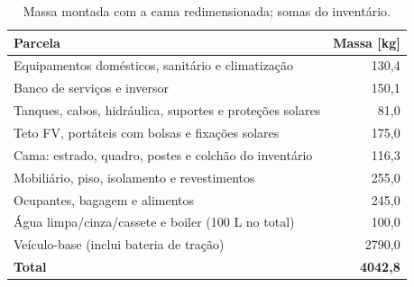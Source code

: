 \begin{table}[H]\centering\small
\caption{Massa montada com a cama redimensionada; somas do inventário.}\label{tab:massa}
\begin{tabularx}{\linewidth}{Xr}
\toprule
Parcela & Massa [kg] \\
\midrule
Equipamentos domésticos, sanitário e climatização & 130,4 \\
Banco de serviços e inversor & 150,1 \\
Tanques, cabos, hidráulica, suportes e proteções solares & 81,0 \\
Teto FV, portáteis com bolsas e fixações solares & 175,0 \\
Cama: estrado, quadro, postes e colchão do inventário & 116,3 \\
Mobiliário, piso, isolamento e revestimentos & 255,0 \\
Ocupantes, bagagem e alimentos & 245,0 \\
Água limpa/cinza/cassete e boiler (100 L no total) & 100,0 \\
Veículo-base (inclui bateria de tração) & 2790,0 \\
\textbf{Total} & \textbf{4042,8} \\
\bottomrule
\end{tabularx}
\end{table}
